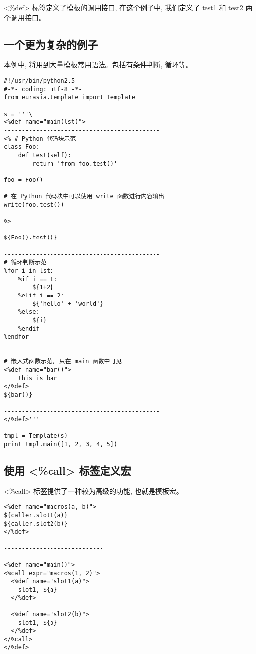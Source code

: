 \documentclass{manual}
\begin{document}
<\%def> 标签定义了模板的调用接口, 在这个例子中, 我们定义了 test1 和 test2 两个调用接口。


\subsection{一个更为复杂的例子}

本例中, 将用到大量模板常用语法。包括有条件判断, 循环等。

\begin{verbatim}
#!/usr/bin/python2.5
#-*- coding: utf-8 -*-
from eurasia.template import Template

s = '''\
<%def name="main(lst)">
--------------------------------------------
<% # Python 代码块示范
class Foo:
	def test(self):
		return 'from foo.test()'

foo = Foo()

# 在 Python 代码块中可以使用 write 函数进行内容输出
write(foo.test())

%>

${Foo().test()}

--------------------------------------------
# 循环判断示范
%for i in lst:
	%if i == 1:
		${1+2}
	%elif i == 2:
		${'hello' + 'world'}
	%else:
		${i}
	%endif
%endfor

--------------------------------------------
# 嵌入式函数示范, 只在 main 函数中可见
<%def name="bar()">
	this is bar
</%def>
${bar()}

--------------------------------------------
</%def>'''

tmpl = Template(s)
print tmpl.main([1, 2, 3, 4, 5])
\end{verbatim}

\subsection{使用 <\%call> 标签定义宏}

<\%call> 标签提供了一种较为高级的功能, 也就是模板宏。

\begin{verbatim}
<%def name="macros(a, b)">
${caller.slot1(a)}
${caller.slot2(b)}
</%def>

----------------------------

<%def name="main()">
<%call expr="macros(1, 2)">
  <%def name="slot1(a)">
    slot1, ${a}
  </%def>

  <%def name="slot2(b)">
    slot1, ${b}
  </%def>
</%call>
</%def>
\end{verbatim}
\end{document}

